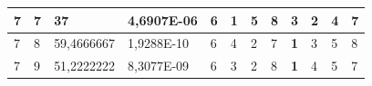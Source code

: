 \documentclass[conference]{IEEEtran}
\begin{document}
\begin{table}[]
\begin{tabular}{|llll|llllllll|}
\multicolumn{1}{|l|}{7}                                                     & \multicolumn{1}{l|}{7}                                                        & \multicolumn{1}{l|}{37}                                                           & 4,6907E-06                     & \multicolumn{1}{l|}{6}                                                  & \multicolumn{1}{l|}{\textbf{1}}                                         & \multicolumn{1}{l|}{5}                                                  & \multicolumn{1}{l|}{8}                                                  & \multicolumn{1}{l|}{3}                                                  & \multicolumn{1}{l|}{2}                                                  & \multicolumn{1}{l|}{4}                                                  & 7                          \\ \hline
\multicolumn{1}{|l|}{7}                                                     & \multicolumn{1}{l|}{8}                                                        & \multicolumn{1}{l|}{59,4666667}                                                   & 1,9288E-10                     & \multicolumn{1}{l|}{6}                                                  & \multicolumn{1}{l|}{4}                                                  & \multicolumn{1}{l|}{2}                                                  & \multicolumn{1}{l|}{7}                                                  & \multicolumn{1}{l|}{\textbf{1}}                                         & \multicolumn{1}{l|}{3}                                                  & \multicolumn{1}{l|}{5}                                                  & 8                          \\ \hline
\multicolumn{1}{|l|}{7}                                                     & \multicolumn{1}{l|}{9}                                                        & \multicolumn{1}{l|}{51,2222222}                                                   & 8,3077E-09                     & \multicolumn{1}{l|}{6}                                                  & \multicolumn{1}{l|}{3}                                                  & \multicolumn{1}{l|}{2}                                                  & \multicolumn{1}{l|}{8}                                                  & \multicolumn{1}{l|}{\textbf{1}}                                         & \multicolumn{1}{l|}{4}                                                  & \multicolumn{1}{l|}{5}                                                  & 7                          \\ \hline

\end{tabular}
\end{table}
\end{document}
